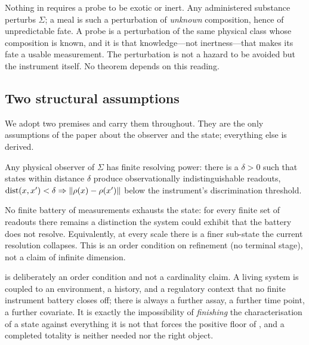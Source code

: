 \begin{remark}
\label{cfc:rem:meal}
Nothing in  requires a probe to be exotic or inert. Any
administered substance perturbs $\Sigma$; a meal is such a perturbation of
\emph{unknown} composition, hence of unpredictable fate. A probe is a
perturbation of the same physical class whose composition is known, and it is
that knowledge---not inertness---that makes its fate a usable measurement. The
perturbation is not a hazard to be avoided but the instrument itself. No
theorem depends on this reading.
\end{remark}

\subsection{Two structural assumptions}

We adopt two premises and carry them throughout. They are the only assumptions
of the paper about the observer and the state; everything else is derived.

\begin{assumption}
\label{cfc:ass:finite}
Any physical observer of $\Sigma$ has finite resolving power: there is a
$\delta>0$ such that states within distance $\delta$ produce observationally
indistinguishable readouts,
$\operatorname{dist}(x,x')<\delta\Rightarrow\norm{\rho(x)-\rho(x')}$ below the
instrument's discrimination threshold.
\end{assumption}

\begin{assumption}
\label{cfc:ass:nonexhaust}
No finite battery of measurements exhausts the state: for every finite set of
readouts there remains a distinction the system could exhibit that the battery
does not resolve. Equivalently, at every scale there is a finer sub-state the
current resolution collapses. This is an order condition on refinement (no
terminal stage), not a claim of infinite dimension.
\end{assumption}

\begin{remark}
\label{cfc:rem:why-nonexhaust}
 is deliberately an order condition and not a cardinality
claim. A living system is coupled to an environment, a history, and a
regulatory context that no finite instrument battery closes off; there is
always a further assay, a further time point, a further covariate. It is
exactly the impossibility of \emph{finishing} the characterisation of a state
against everything it is not that forces the positive floor of ,
and a completed totality is neither needed nor the right object.
\end{remark}

